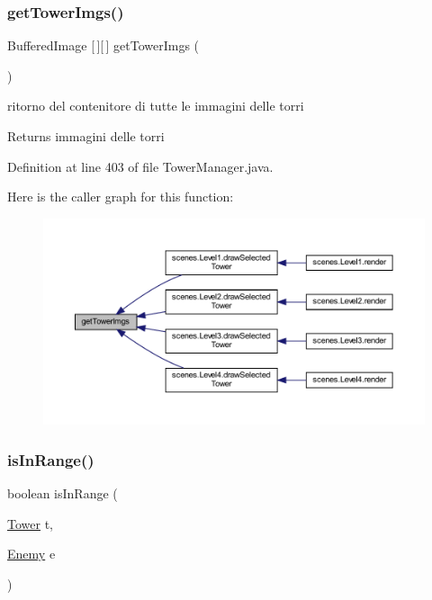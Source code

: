 \subsubsection{\texorpdfstring{get\+Tower\+Imgs()}{getTowerImgs()}}
{\footnotesize\ttfamily Buffered\+Image \mbox{[}$\,$\mbox{]}\mbox{[}$\,$\mbox{]} get\+Tower\+Imgs (\begin{DoxyParamCaption}{ }\end{DoxyParamCaption})}



ritorno del contenitore di tutte le immagini delle torri 

\begin{DoxyReturn}{Returns}
immagini delle torri 
\end{DoxyReturn}


Definition at line 403 of file Tower\+Manager.\+java.

Here is the caller graph for this function\+:\nopagebreak
\begin{figure}[H]
\begin{center}
\leavevmode
\includegraphics[width=350pt]{classmanagers_1_1_tower_manager_aeae3bb8b35e0507fe9105c2eb4713339_icgraph}
\end{center}
\end{figure}
\mbox{\label{classmanagers_1_1_tower_manager_a5f1dea7776d18a6f69428e43c4845fdb}} 
\subsubsection{\texorpdfstring{is\+In\+Range()}{isInRange()}}
{\footnotesize\ttfamily boolean is\+In\+Range (\begin{DoxyParamCaption}\item[{\hyperlink{classtowers_1_1_tower}{Tower}}]{t,  }\item[{\hyperlink{classenemies_1_1_enemy}{Enemy}}]{e }\end{DoxyParamCaption})}



